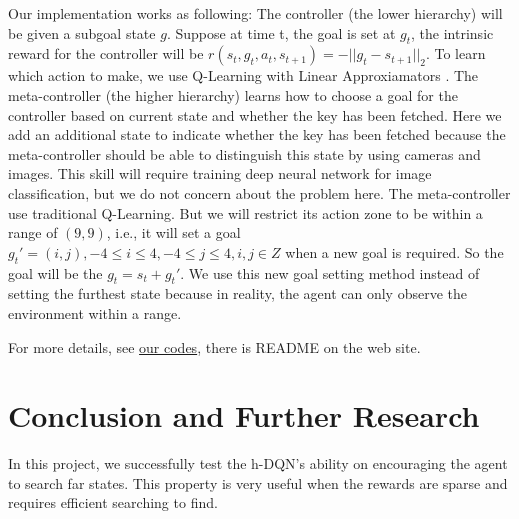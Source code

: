 \documentclass{article}
\begin{document}
\begin{spacing}{1.1}
    Our implementation works as following: The controller (the lower hierarchy) will be given a subgoal state $g$. Suppose at time t, the goal is set at $g_t$, the intrinsic reward for the controller will be $r(s_t, g_t, a_t, s_{t+1}) = -||g_t - s_{t+1}||_2$. To learn which action to make, we use Q-Learning with Linear Approxiamators \cite{lecture}. The meta-controller (the higher hierarchy) learns how to choose a goal for the controller based on current state and whether the key has been fetched. Here we add an additional state to indicate whether the key has been fetched because the meta-controller should be able to distinguish this state by using cameras and images. This skill will require training deep neural network for image classification, but we do not concern about the problem here. The meta-controller use traditional Q-Learning. But we will restrict its action zone to be within a range of $(9, 9)$, i.e., it will set a goal $g_t' = (i, j), -4\leq i\leq 4, -4\leq j\leq 4, i, j\in Z$ when a new goal is required. So the goal will be the $g_t = s_t + g_t'$. We use this new goal setting method instead of setting the furthest state because in reality, the agent can only observe the environment within a range.



    For more details, see \href{https://github.com/faebdc/AI-Project}{our codes}, there is README on the web site.

    \section{Conclusion and Further Research}
    In this project, we successfully test the h-DQN's ability on encouraging the agent to search far states. This property is very useful when the rewards are sparse and requires efficient searching to find.


\end{spacing}
\end{document}
